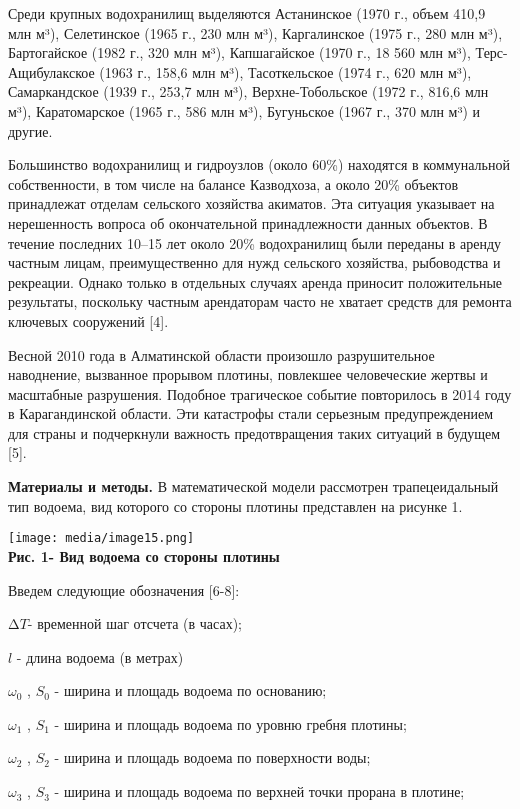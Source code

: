 \documentclass[
]{article}
\begin{document}
Среди крупных водохранилищ выделяются Астанинское (1970 г., объем 410,9
млн м³), Селетинское (1965 г., 230 млн м³), Каргалинское (1975 г., 280
млн м³), Бартогайское (1982 г., 320 млн м³), Капшагайское (1970 г., 18
560 млн м³), Терс-Ащибулакское (1963 г., 158,6 млн м³), Тасоткельское
(1974 г., 620 млн м³), Самаркандское (1939 г., 253,7 млн м³),
Верхне-Тобольское (1972 г., 816,6 млн м³), Каратомарское (1965 г., 586
млн м³), Бугуньское (1967 г., 370 млн м³) и другие.

Большинство водохранилищ и гидроузлов (около 60\%) находятся в
коммунальной собственности, в том числе на балансе Казводхоза, а около
20\% объектов принадлежат отделам сельского хозяйства акиматов. Эта
ситуация указывает на нерешенность вопроса об окончательной
принадлежности данных объектов. В течение последних 10--15 лет около
20\% водохранилищ были переданы в аренду частным лицам, преимущественно
для нужд сельского хозяйства, рыбоводства и рекреации. Однако только в
отдельных случаях аренда приносит положительные результаты, поскольку
частным арендаторам часто не хватает средств для ремонта ключевых
сооружений {[}4{]}.

Весной 2010 года в Алматинской области произошло разрушительное
наводнение, вызванное прорывом плотины, повлекшее человеческие жертвы и
масштабные разрушения. Подобное трагическое событие повторилось в 2014
году в Карагандинской области. Эти катастрофы стали серьезным
предупреждением для страны и подчеркнули важность предотвращения таких
ситуаций в будущем {[}5{]}.

\textbf{Материалы и методы.} В математической модели рассмотрен
трапецеидальный тип водоема, вид которого со стороны плотины представлен
на рисунке 1.

\texttt{[image: media/image15.png]}\\
\textbf{Рис. 1- Вид водоема со стороны плотины}

Введем следующие обозначения {[}6-8{]}:

\(\mathrm{\Delta}T\)- временной шаг отсчета (в часах);

\(l\) - длина водоема (в метрах)

\(\omega_{0}\) , \(S_{0}\) - ширина и площадь водоема по основанию;

\(\omega_{1}\) , \(S_{1}\) - ширина и площадь водоема по уровню гребня
плотины;

\(\omega_{2}\) , \(S_{2}\) - ширина и площадь водоема по поверхности
воды;

\(\omega_{3}\) , \(S_{3}\) - ширина и площадь водоема по верхней точки
прорана в плотине;
\end{document}
